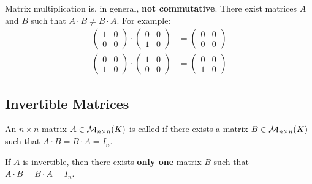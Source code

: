 \begin{importantremark}
Matrix multiplication is, in general, \textbf{not commutative}. There exist matrices $A$ and $B$ such that $A \cdot B \neq B \cdot A$. For example:
\begin{align*}
    \begin{pmatrix} 1 & 0 \\ 0 & 0 \end{pmatrix} \cdot \begin{pmatrix} 0 & 0 \\ 1 & 0 \end{pmatrix} &= \begin{pmatrix} 0 & 0 \\ 0 & 0 \end{pmatrix} \\
    \begin{pmatrix} 0 & 0 \\ 1 & 0 \end{pmatrix} \cdot \begin{pmatrix} 1 & 0 \\ 0 & 0 \end{pmatrix} &= \begin{pmatrix} 0 & 0 \\ 1 & 0 \end{pmatrix}
\end{align*}
\end{importantremark}

\subsection{Invertible Matrices}

\begin{definition}[Invertibility]
\label{def:invertible_matrix}
An $n \times n$ matrix $A \in \mathcal{M}_{n \times n}(K)$ is called  if there exists a matrix $B \in \mathcal{M}_{n \times n}(K)$ such that $A \cdot B = B \cdot A = I_n$.
\end{definition}

\begin{proposition*}
\label{prop:uniqueness_of_inverse_matrix}
If $A$ is invertible, then there exists \textbf{only one} matrix $B$ such that $A \cdot B = B \cdot A = I_n$.
\end{proposition*}

